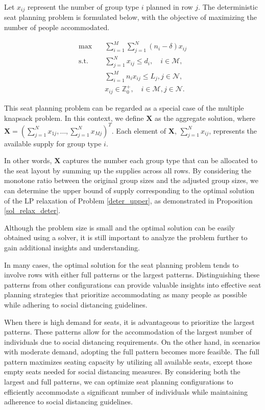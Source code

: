 Let $x_{ij}$ represent the number of group type $i$ planned in row $j$. The deterministic seat planning problem is formulated below, with the objective of maximizing the number of people accommodated.

\begin{equation}\label{deter_upper}
    \begin{aligned}
    \max \quad & \sum_{i=1}^{M}  \sum_{j= 1}^{N} (n_i- \delta) x_{ij} \\
    \text {s.t.} \quad & \sum_{j= 1}^{N} x_{ij} \leq d_{i}, \quad i \in \mathcal{M}, \\
    & \sum_{i=1}^{M} n_{i} x_{ij} \leq L_j, j \in \mathcal{N}, \\
    & x_{ij} \in \mathbb{Z}^{+}_{0}, \quad i \in \mathcal{M}, j \in \mathcal{N}.
    \end{aligned}
  \end{equation}
  
This seat planning problem can be regarded as a special case of the multiple knapsack problem. In this context, we define $\bm{X}$ as the aggregate solution, where $\bm{X} = (\sum_{j=1}^{N} x_{1j}, \ldots, \sum_{j=1}^{N} x_{Mj})^T$. Each element of $\bm{X}$, $\sum_{j=1}^{N} x_{ij}$, represents the available supply for group type $i$.
  
In other words, $\bm{X}$ captures the number each group type that can be allocated to the seat layout by summing up the supplies across all rows. By considering the monotone ratio between the original group sizes and the adjusted group sizes, we can determine the upper bound of supply corresponding to the optimal solution of the LP relaxation of Problem \eqref{deter_upper}, as demonstrated in Proposition \ref{sol_relax_deter}.

Although the problem size is small and the optimal solution can be easily obtained using a solver, it is still important to analyze the problem further to gain additional insights and understanding.

In many cases, the optimal solution for the seat planning problem tends to involve rows with either full patterns or the largest patterns. Distinguishing these patterns from other configurations can provide valuable insights into effective seat planning strategies that prioritize accommodating as many people as possible while adhering to social distancing guidelines.

When there is high demand for seats, it is advantageous to prioritize the largest patterns. These patterns allow for the accommodation of the largest number of individuals due to social distancing requirements. On the other hand, in scenarios with moderate demand, adopting the full pattern becomes more feasible. The full pattern maximizes seating capacity by utilizing all available seats, except those empty seats needed for social distancing measures. By considering both the largest and full patterns, we can optimize seat planning configurations to efficiently accommodate a significant number of individuals while maintaining adherence to social distancing guidelines. 
  

